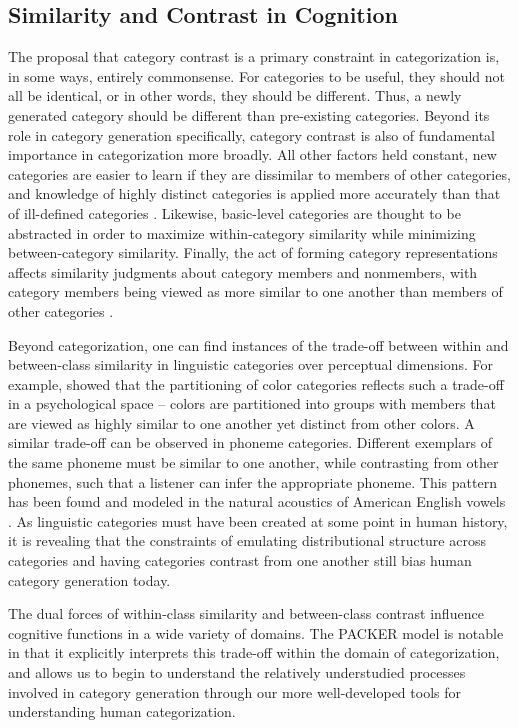 \documentclass[12pt]{article}
\begin{document}
\begin{flushleft}
\subsection{Similarity and Contrast in Cognition}
The proposal that category contrast is a primary constraint in categorization is, in some ways, entirely commonsense. For categories to be useful, they should not all be identical, or in other words, they should be different. Thus, a newly generated category should be different than pre-existing categories. Beyond its role
in category generation specifically, category contrast is also of fundamental importance in
categorization more broadly. All other factors held constant, new categories are
easier to learn if they are dissimilar to members of other categories, and
knowledge of highly distinct categories is applied more accurately than that of
ill-defined categories \citep{ashby1994categorization,imai1965discriminability}.
Likewise, basic-level categories \citep{rosch1976basic} are thought to be
abstracted in order to maximize within-category similarity while minimizing
between-category similarity. Finally, the act of forming category
representations affects similarity judgments about category members and
nonmembers, with category members being viewed as more similar to one another
than members of other categories
\citep{goldstone1994influences,goldstone2001altering,goldstone1996isolated}.

Beyond categorization, one can find instances of the trade-off between within
and between-class similarity in linguistic categories over perceptual
dimensions. For example, \cite{regier2007} showed that the partitioning of color
categories reflects such a trade-off in a psychological space -- colors are
partitioned into groups with members that are viewed as highly similar to one
another yet distinct from other colors. A similar trade-off can be observed in
phoneme categories. Different exemplars of the same phoneme must be similar to
one another, while contrasting from other phonemes, such that a listener can
infer the appropriate phoneme. This pattern has been found and modeled in the
natural acoustics of American English vowels
\citep{feldman2013,hillenbrand1995}. As linguistic categories must have been
created at some point in human history, it is revealing that the constraints of
emulating distributional structure across categories and having categories
contrast from one another still bias human category generation today.

The dual forces of within-class similarity and between-class contrast influence
cognitive functions in a wide variety of domains. The PACKER model is notable in
that it explicitly interprets this trade-off within the domain of
categorization, and allows us to begin to understand the relatively understudied
processes involved in category generation through our more well-developed tools
for understanding human categorization.


\end{flushleft}
\end{document}
